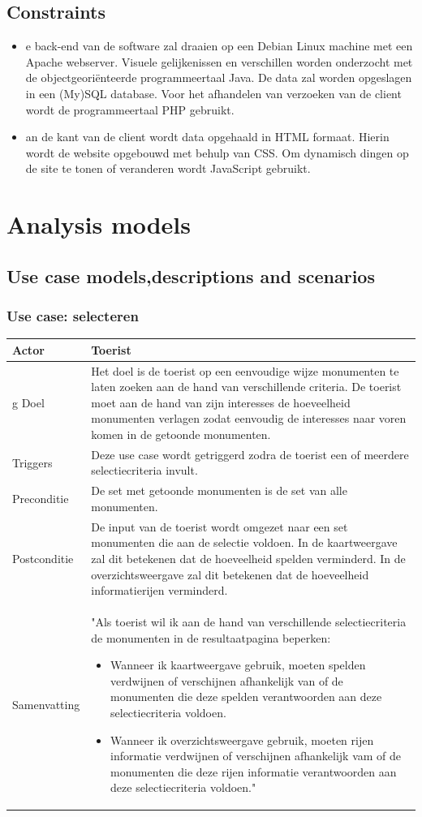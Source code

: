 \documentclass[a4paper,10pt]{article}
\newcommand{\rsection}[1]{
\section{#1}\label{sec:#1}
}
\newcommand{\rsubsection}[1]{
\subsection{#1}\label{sec:sub:#1}
}
\newcommand{\rsubsubsection}[1]{
\subsubsection{#1}\label{sec:sub:sub:#1}
}
\newcounter{rreqno}
\newcommand{\rreq}[1]{\refstepcounter{rreqno}\label{#1}}
\newcommand{\reqitem}[1]{\rreq{#1}\item[(req \therreqno)]}
\newcommand\addrow[2]{#1 &#2\\ }
\newcommand\addheading[2]{#1 &#2\\ \hline}
\newcommand\tabularhead{\begin{tabular}{| lp{12cm} |}
\hline
}
\newenvironment{usecase}{\tabularhead}{\hline\end{tabular}}
\begin{document}
	\rsubsection{Constraints}
	\begin{itemize}
		\reqitem De back-end van de software zal draaien op een Debian Linux machine met een Apache webserver. Visuele gelijkenissen en verschillen worden onderzocht met de objectgeori\"enteerde programmeertaal Java. De data zal worden opgeslagen in een (My)SQL database. Voor het afhandelen van verzoeken van de client wordt de programmeertaal PHP gebruikt.
		\reqitem Aan de kant van de client wordt data opgehaald in HTML formaat. Hierin wordt de website opgebouwd met behulp van CSS. Om dynamisch dingen op de site te tonen of veranderen wordt JavaScript gebruikt.
\end{itemize}
		
	\clearpage
	\rsection{Analysis models}
	\rsubsection{Use case models,descriptions and scenarios}
		\rsubsubsection{Use case: selecteren}
		\begin{usecase}
		\addheading{Actor}{Toerist} g
			\addrow{Doel}{Het doel is de toerist op een eenvoudige wijze monumenten te laten zoeken aan de hand van verschillende criteria. De toerist moet aan de hand van zijn interesses de hoeveelheid monumenten verlagen zodat eenvoudig de interesses naar voren komen in de getoonde monumenten.}
			\addrow{Triggers}{Deze use case wordt getriggerd zodra de toerist een of meerdere selectiecriteria invult.}
			\addrow{Preconditie}{De set met getoonde monumenten is de set van alle monumenten.}
			\addrow{Postconditie}{De input van de toerist wordt omgezet naar een set monumenten die aan de selectie voldoen. In de kaartweergave zal dit betekenen dat de hoeveelheid spelden verminderd. In de overzichtsweergave zal dit betekenen dat de hoeveelheid informatierijen verminderd.}
			\addrow{Samenvatting}{"Als toerist wil ik aan de hand van verschillende selectiecriteria de monumenten in de resultaatpagina beperken:
				\begin{itemize}
					\item Wanneer ik kaartweergave gebruik, moeten spelden verdwijnen of verschijnen afhankelijk van of de monumenten die deze spelden verantwoorden aan deze selectiecriteria voldoen.
					\item Wanneer ik overzichtsweergave gebruik, moeten rijen informatie verdwijnen of verschijnen afhankelijk vam of de monumenten die deze rijen informatie verantwoorden aan deze selectiecriteria voldoen."
				\end{itemize}
			}
			\end{usecase}
\end{document}
